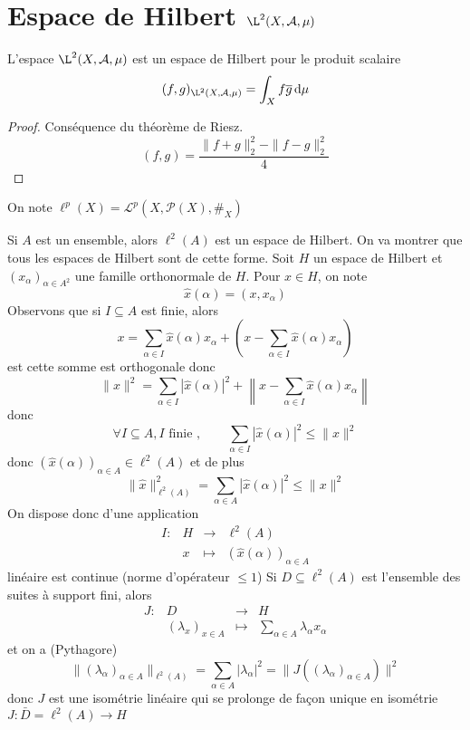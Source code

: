 \section{Espace de Hilbert \texorpdfstring{$\L^2(X, \mathcal  A, \mu)$}{L2(X, A, mu)}}

\begin{thm}
    L'espace $\L^2(X, \mathcal  A, \mu)$ est un espace de Hilbert pour le produit scalaire \[
        (f, g)_{\L^2(X, \mathcal  A, \mu)}=\int_Xf\bar g\diff\mu
    \] 
\end{thm}

\begin{proof}
Conséquence du théorème de Riesz. \[
(f,g) =\frac{\|f+g\|_2^2 -\|f-g\|_2^2}{4}
\] 
\end{proof}


\begin{dfn}
    On note $\ell^p(X)=\mathcal  L^p(X, \mathcal  P(X), \#_X)$
\end{dfn}

Si $A$ est un ensemble, alors  $\ell^2(A)$ est un espace de Hilbert. On va montrer que tous les espaces de Hilbert sont de cette forme. Soit $H$ un espace de Hilbert et  $(x_{\alpha})_{\alpha \in  A^2 }$ une famille orthonormale de $H$. Pour  $x \in  H$, on note \[
    \hat{x} (\alpha) = (x, x_\alpha)
\] 
Observons que si $I \subseteq A$ est finie, alors  \[
    x=\sum_{\alpha \in  I} \hat{x} (\alpha)x_\alpha + \left( x-\sum_{\alpha \in  I} \hat{x} (\alpha)x_\alpha \right)
\] 
est cette somme est orthogonale donc \[
    \|x\|^2 = \sum_{\alpha \in  I} |\hat{x}(\alpha)|^2 + \left\|x-\sum_{\alpha \in  I} \hat{x}(\alpha)x_\alpha\right\|
\] 
donc \[
    \forall I\subseteq A, I \text{ finie }, \qquad  \sum_{\alpha \in  I} |\hat{x}(\alpha)|^2 \leq  \|x\|^2 
\] 
donc $(\hat{x}(\alpha))_{\alpha\in A} \in  \ell^2(A)$ et de plus \[
    \|\hat{x}\|^2_{\ell^2(A)}=\sum_{\alpha \in  A} |\hat{x}(\alpha)|^2 \leq \|x\|^2 
\] 
On dispose donc d'une application \[
\begin{array}{rrcl}
    I:& H & \longrightarrow & \ell^2(A) \\
      & x & \longmapsto & \displaystyle (\hat{x}(\alpha))_{\alpha \in  A}
\end{array}
\] 
linéaire est continue (norme d'opérateur $\leq 1$)
Si $D\subseteq \ell^2(A)$ est l'ensemble des suites à support fini, alors \[
\begin{array}{rrcl}
    J:& D & \longrightarrow & H \\
      & (\lambda_x)_{x \in  A} & \longmapsto & \displaystyle \sum_{\alpha \in A} \lambda_\alpha x_\alpha
\end{array}
\] 
et on a (Pythagore) \[
    \|(\lambda_\alpha)_{\alpha \in A}\|_{\ell^2(A)}=\sum_{\alpha \in  A}|\lambda_\alpha|^2 = \|J((\lambda_\alpha)_{\alpha \in  A})\|^2 
\] 
donc $J$ est une isométrie linéaire qui se prolonge de façon unique en isométrie  $J:\bar{D}=\ell^2(A) \longrightarrow H$ 

